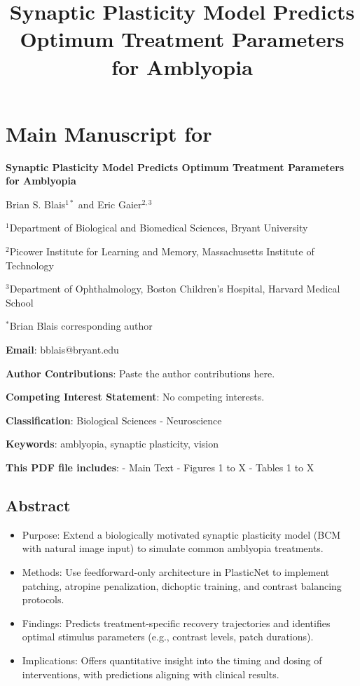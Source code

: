\documentclass[
]{article}
\title{Synaptic Plasticity Model Predicts Optimum Treatment Parameters
for Amblyopia}
\author{}
\date{}
\providecommand{\tightlist}{%
  \setlength{\itemsep}{0pt}\setlength{\parskip}{0pt}}
\begin{document}
\maketitle

\section{Main Manuscript for}\label{sec:main-manuscript-for}

\textbf{Synaptic Plasticity Model Predicts Optimum Treatment Parameters
for Amblyopia}

Brian S. Blais\(^{1*}\) and Eric Gaier\(^{2,3}\)

\(^{1}\)Department of Biological and Biomedical Sciences, Bryant
University

\(^{2}\)Picower Institute for Learning and Memory, Massachusetts
Institute of Technology

\(^{3}\)Department of Ophthalmology, Boston Children's Hospital, Harvard
Medical School

\(^{*}\)Brian Blais corresponding author

\textbf{Email}: bblais@bryant.edu

\textbf{Author Contributions}: Paste the author contributions here.

\textbf{Competing Interest Statement}: No competing interests.

\textbf{Classification}: Biological Sciences - Neuroscience

\textbf{Keywords}: amblyopia, synaptic plasticity, vision

\textbf{This PDF file includes}: - Main Text - Figures 1 to X - Tables 1
to X

\subsection{Abstract}\label{sec:abstract}

\begin{itemize}
\tightlist
\item[$\square$]
  Purpose: Extend a biologically motivated synaptic plasticity model
  (BCM with natural image input) to simulate common amblyopia
  treatments.
\item[$\square$]
  Methods: Use feedforward-only architecture in PlasticNet to implement
  patching, atropine penalization, dichoptic training, and contrast
  balancing protocols.
\item[$\square$]
  Findings: Predicts treatment-specific recovery trajectories and
  identifies optimal stimulus parameters (e.g., contrast levels, patch
  durations).
\item[$\square$]
  Implications: Offers quantitative insight into the timing and dosing
  of interventions, with predictions aligning with clinical results.
\end{itemize}
\end{document}
